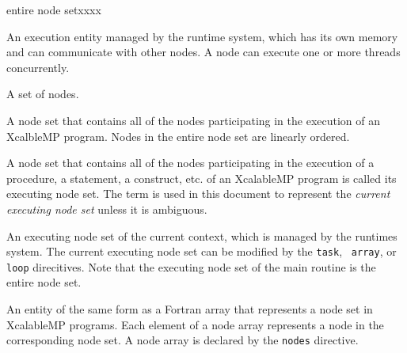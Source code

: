 \begin{namelist}{entire node setxxxx}

%



 An execution entity managed by the {\XMP} runtime system, which has its
 own memory and can communicate with other nodes. A node can execute one
 or more threads concurrently.

%


 A set of nodes.


 A node set that contains all of the nodes participating in the
 execution of an XcalbleMP program. Nodes in the entire node set are
 linearly ordered.


 A node set that contains all of the nodes participating in the
 execution of a procedure, a statement, a construct, etc. of an
 XcalableMP program is called its executing node set.
%
 The term is used in this document to represent the {\it current
 executing node set} unless it is ambiguous.


 An executing node set of the current context, which is managed by the
 {\XMP} runtimes system.
%
 The current executing node set can be modified by the {\tt task}, {\tt
 array}, or {\tt loop} direcitives. Note that the executing node set of
 the main routine is the entire node set.


 An {\XMP} entity of the same form as a Fortran array that represents a
 node set in XcalableMP programs. Each element of a node array
 represents a node in the corresponding node set. A node array is
 declared by the {\tt nodes} directive.


\end{namelist}
